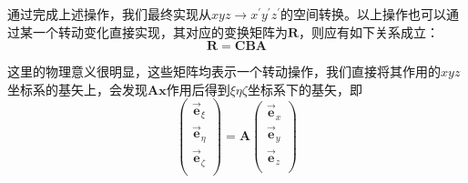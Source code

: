 通过完成上述操作，我们最终实现从$xyz\rightarrow x^{\prime}y^{\prime}z^{\prime}$的空间转换。以上操作也可以通过某一个转动变化直接实现，其对应的变换矩阵为$\bm{R}$，则应有如下关系成立：
\begin{equation}
    \bm{R} = \bm{CBA}
\end{equation}
\begin{note}
    这里的物理意义很明显，这些矩阵均表示一个转动操作，我们直接将其作用的$xyz$坐标系的基矢上，会发现$\bm{Ax}$作用后得到$\xi\eta\zeta$坐标系下的基矢，即
    \begin{equation*}
        \begin{pmatrix}
            \vec{\bm{e}}_{\xi} \\
            \vec{\bm{e}}_{\eta} \\
            \vec{\bm{e}}_{\zeta} \\
        \end{pmatrix}
        =  \bm{A}
        \begin{pmatrix}
            \vec{\bm{e}}_{x} \\
            \vec{\bm{e}}_{y} \\
            \vec{\bm{e}}_{z} \\
        \end{pmatrix}
    \end{equation*}
\end{note}

